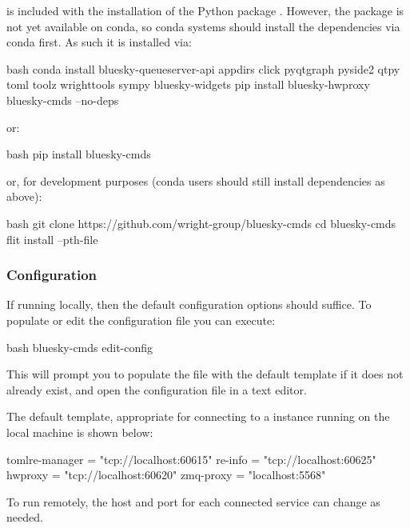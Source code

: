 \blueskycmds is included with the installation of the Python package \blueskycmds.
However, the package is not yet available on conda, so conda systems should install the dependencies via conda first.
As such it is installed via:

\begin{codefragment}{bash}
conda install bluesky-queueserver-api appdirs click pyqtgraph pyside2 qtpy toml toolz wrighttools sympy bluesky-widgets
pip install bluesky-hwproxy bluesky-cmds --no-deps
\end{codefragment}

or:

\begin{codefragment}{bash}
pip install bluesky-cmds
\end{codefragment}

or, for development purposes (conda users should still install dependencies as above):

\begin{codefragment}{bash}
git clone https://github.com/wright-group/bluesky-cmds
cd bluesky-cmds
flit install --pth-file
\end{codefragment}

\subsubsection{Configuration}

If running locally, then the default configuration options should suffice.
To populate or edit the configuration file you can execute:

\begin{codefragment}{bash}
bluesky-cmds edit-config
\end{codefragment}

This will prompt you to populate the file with the default template if it does not already exist, and open the configuration file in a text editor.

The default template, appropriate for connecting to a \biab instance running on the local machine is shown below:

\begin{codefragment}{toml}\noop[bluesky]
re-manager = "tcp://localhost:60615"
re-info = "tcp://localhost:60625"
hwproxy = "tcp://localhost:60620"
zmq-proxy = "localhost:5568"
\end{codefragment}

To run remotely, the host and port for each connected service can change as needed.

